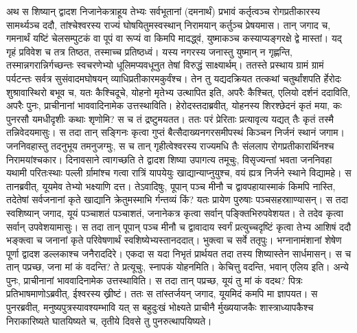 \adhyAya
{}
\vakya अथ स शिष्यान् द्वादश निजानेकत्राहूय तेभ्यः सर्वभूतानां (दमनार्थं) प्रभावं कर्तृत्वञ्च रोगप्रतीकारस्य सामर्थ्यञ्च ददौ,
\vakya तांश्चेश्वरस्य राज्यं घोषयितुमस्वस्थान् निरामयान् कर्तुञ्च प्रेषयमास।
\vakya तान् जगाद च, गमनार्थं यष्टिं चेलसम्पुटकं वा पूपं वा रूप्यं वा किमपि मादद्ध्वं, युष्माकञ्च कस्याप्यङ्गरक्षे द्वे मास्तां।
\vakya यद् गृहं प्रविवेश च तत्र तिष्ठत, तस्माच्च प्रतिष्ठध्वं।
\vakya यस्य नगरस्य जनास्तु युष्मान् न गृह्णन्ति, तस्मान्नगरान्निर्गच्छन्तः स्वचरणेभ्यो धूलिमप्यवधूनुत तेषां विरुद्धं साक्ष्यार्थम्।
\vakya ततस्ते प्रस्थाय ग्रामं ग्रामं पर्यटन्तः सर्वत्र सुसंवादमघोषयन् व्याधिप्रतीकारमकुर्वंश्च।
\vakya तेन तु यद्यदक्रियत तत्कथां चतुर्थांशपति र्हेरोदः शुश्रावास्थिरो बभूव च, यतः कैश्चिदूचे, योहनो मृतेभ्य उत्थापित इति,
\vakya अपरैः कैश्चित्, एलियो दर्शनं ददाविति, अपरैः पुनः, प्राचीनानां भाववादिनामेक उत्तस्थाविति।
\vakya हेरोदस्तदाब्रवीत्, योहनस्य शिरश्छेदनं कृतं मया, कः पुनरसौ यमधीदृशीः कथाः शृणोमि? स च तं द्रष्टुमयतत।
\vakya ततः परं प्रेरिताः प्रत्यावृत्य यद्यत् तैः कृतं तस्मै तन्निवेदयमासुः। स तदा तान् सङ्गिनः कृत्वा गुप्तं बैत्सैदाख्यनगरसमीपस्थं किञ्चन निर्जनं स्थानं जगाम।
\vakya जननिवहास्तु तदनुभूय तमनुजग्मुः, स च तान् गृहीत्वेश्वरस्य राज्यमधि तैः संललाप रोगप्रतीकारार्थिनश्च निरामयांश्चकार।
\vakya दिनावसाने त्वागच्छति ते द्वादश शिष्या उपागत्य तमूचुः, विसृज्यन्तां भवता जननिवहा यथामी परितःस्थाः पल्ली र्ग्रामांश्च गत्वा रात्रिं यापयेयुः खाद्यान्याप्नुयुश्च, वयं ह्यत्र निर्जने स्थाने विद्यामहे।
\vakya स तानब्रवीत्, यूयमेव तेभ्यो भक्ष्याणि दत्त। तेऽवादिषुः, पूपान् पञ्च मीनौ च द्वावपहायास्माकं किमपि नास्ति, तदेतेषां सर्वजनानां कृते खाद्यानि क्रेतुमस्माभि र्गन्तव्यं किं?
\vakya यतः प्रायेण पुरुषाः पञ्चसहस्रााण्यासन्। स तदा स्वशिष्यान् जगाद, यूयं पञ्चाशतं पञ्चाशतं, जनानेकत्र कृत्वा सर्वान् पङ्क्तिभिरुपवेशयत।
\vakya ते तदेव कृत्वा सर्वान् उपवेशयामासुः।
\vakya स तदा तान् पूपान् पञ्च मीनौ च द्वावादाय स्वर्गं प्रत्युच्चदृष्टिं कृत्वा तेभ्य आशिषं ददौ भङ्क्त्वा च जनानां कृते परिवेषणार्थं स्वशिष्येभ्यस्तानददात्।
\vakya भुक्त्वा च सर्वे ततृपुः। भग्नानामंशानां शेषेण पूर्णा द्वादश डल्लकाश्च जनैराददिरे।
\vakya एकदा स यदा निभृतं प्रार्थयत तदा तस्य शिष्यास्तेन सार्धमासन्। स च तान् पप्रच्छ, जना मां कं वदन्ति?
\vakya ते प्रत्यूचुः, स्नापकं योहनमिति। केचित्तु वदन्ति, भवान् एलिय इति। अन्ये पुनः, प्राचीनानां भाववादिनामेक उत्तस्थाविति। स तदा तान् पप्रच्छ, यूयं तु मां कं वदथ?
\vakya पित्रः प्रतिभाषमाणोऽब्रवीत्, ईश्वरस्य ख्रीष्टं।
\vakya ततः स तांस्तर्जयन् जगाद, यूयमिदं कमपि मा ज्ञापयत।
\vakya स पुनरब्रवीत्, मनुष्यपुत्रस्यावश्यम्भावि यत् स बहुदुःखं भोक्ष्यते प्राचीनै र्मुख्ययाजकैः शास्त्राध्यापकैश्च निराकारिष्यते घातयिष्यते च, तृतीये दिवसे तु पुनरुत्थापयिष्यते।
